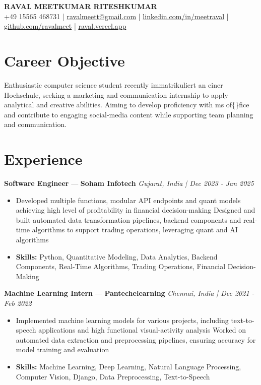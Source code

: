 \documentclass[a4paper,10pt]{article}
\begin{document}
\begin{center}
  {\Large\bfseries RAVAL MEETKUMAR RITESHKUMAR}\\[2pt]
  {\small +49 15565 468731 \;|\; \href{mailto:ravalmeett@gmail.com}{ravalmeett@gmail.com} \;|\; \href{https://www.linkedin.com/in/meetraval/}{linkedin.com/in/meetraval} \;|\; \href{https://github.com/ravalmeet}{github.com/ravalmeet} \;|\; \href{https://raval.vercel.app/}{raval.vercel.app}}
\end{center}
\vspace{-3pt}

\section*{Career Objective}
Enthusiastic computer science student recently immatrikuliert an einer Hochschule, seeking a marketing and communication internship to apply analytical and creative abilities. Aiming to develop proficiency with ms of\{\}fice and contribute to engaging social-media content while supporting team planning and communication.\par

\section*{Experience}
\textbf{Software Engineer} — \textbf{Soham Infotech} \hfill \textit{Gujarat, India \;|\; Dec 2023 - Jan 2025}\par
\vspace{1pt}
\begin{itemize}
  \item Developed multiple functions, modular API endpoints and quant models achieving high level of profitability in financial decision-making Designed and built automated data transformation pipelines, backend components and real-time algorithms to support trading operations, leveraging quant and AI algorithms
  \item \textbf{Skills:} Python, Quantitative Modeling, Data Analytics, Backend Components, Real-Time Algorithms, Trading Operations, Financial Decision-Making
\end{itemize}
\vspace{3pt}
\textbf{Machine Learning Intern} — \textbf{Pantechelearning} \hfill \textit{Chennai, India \;|\; Dec 2021 - Feb 2022}\par
\vspace{1pt}
\begin{itemize}
  \item Implemented machine learning models for various projects, including text-to-speech applications and high functional visual-activity analysis Worked on automated data extraction and preprocessing pipelines, ensuring accuracy for model training and evaluation
  \item \textbf{Skills:} Machine Learning, Deep Learning, Natural Language Processing, Computer Vision, Django, Data Preprocessing, Text-to-Speech
\end{itemize}
\end{document}
